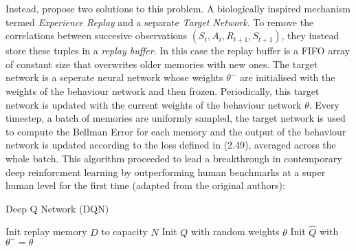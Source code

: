 Instead, \cite{Mnih2015} propose two solutions to this problem. A biologically
inspired mechanism termed \emph{Experience Replay} and a separate \emph{Target Network}.
To remove the correlations between succesive observations $(S_t,A_t,R_{t+1},S_{t+1})$, they
instead store these tuples in a \emph{replay buffer}. In this case the replay buffer is a FIFO
array of constant size that overwrites older memories with new ones. The target network
is a seperate neural network whose weights $\theta^-$ are initialised with the weights of
the behaviour network and then frozen. Periodically, this target network is updated with the
current weights of the behaviour network $\theta$. 
Every timestep, a batch of memories are uniformly sampled, the target network is used to compute the Bellman Error
for each memory and the output of the behaviour network is updated according to the loss defined in (2.49),
averaged across the whole batch.
This algorithm proceeded to lead a breakthrough in contemporary deep reinforcment learning by outperforming
human benchmarks at a super human level for the first time (adapted from the original authors):
\begin{algorithm}[!htb]
    \SetAlgoLined
    \caption{Deep Q Network (DQN)}
    Init replay memory $D$ to capacity $N$ \;
    Init $Q$ with random weights $\theta$\;
    Init $\hat{Q}$ with $\theta^- = \theta$\;
\end{algorithm}

